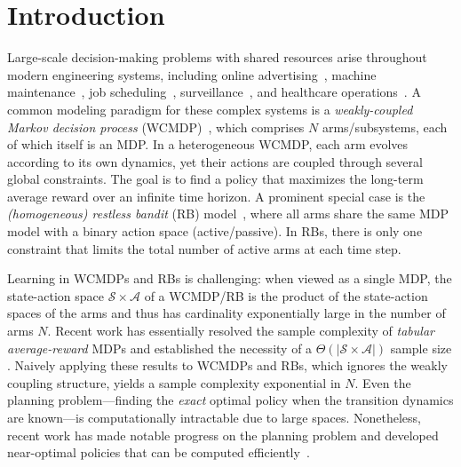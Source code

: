 \documentclass[mnsc,nonblindrev]{informs3}
\begin{document}
\maketitle

\section{Introduction}\label{sec:Intro}
Large-scale decision-making problems with shared resources arise throughout modern engineering systems, including online advertising~\citep{boutilier2016budget, zhou2023rl}, machine maintenance~\citep{glazebrook2005index}, job scheduling~\citep{yu2018deadline}, surveillance~\citep{villar2016indexability}, and healthcare operations~\citep{biswas2021learning}. A common modeling paradigm for these complex systems is a \emph{weakly-coupled Markov decision process} (WCMDP)~\citep{hawkins2003langrangian}, which comprises $N$ arms/subsystems, each of which itself is an MDP. In a heterogeneous WCMDP, each arm evolves according to its own dynamics, yet their actions are coupled through several global constraints. The goal is to find a policy that maximizes the long-term average reward over an infinite time horizon. A prominent special case is the \emph{(homogeneous) restless bandit} (RB) model~\citep{whittle1988restless}, where all arms share the same MDP model with a binary action space (active/passive). In RBs, there is only one constraint that limits the total number of active arms at each time step. 

 

Learning in WCMDPs and RBs is challenging: when viewed as a single MDP, the state-action space $\boldsymbol{\mathcal{S}} \times \boldsymbol{\mathcal{A}}$ of a WCMDP/RB is the product of the state-action spaces of the arms and thus has cardinality exponentially large in the number of arms $N$. Recent work has essentially resolved the sample complexity of \emph{tabular average-reward} MDPs and established the necessity of a $\Theta(|\boldsymbol{\mathcal{S}} \times \boldsymbol{\mathcal{A}}|)$ sample size \citep{wang_near_2022, wang_optimal_2024, zurek_span-based_2025, zurek2025span}. %
Naively applying these results to WCMDPs and RBs, which ignores the weakly coupling structure, yields a sample complexity exponential in $N$. Even the planning problem---finding the \emph{exact} optimal policy when the transition dynamics are known---is computationally intractable due to large spaces. Nonetheless, recent work has made notable progress on the planning problem and developed near-optimal policies that can be computed efficiently~\citep{zhang2025projection,hong2024achieving,hong2024unichain,yan2024achieving,Gast_2024}. 
\end{document}
